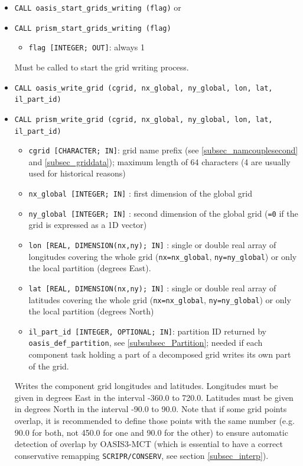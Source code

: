\begin{itemize}

\item {\tt CALL oasis\_start\_grids\_writing (flag)} or
\item {\tt CALL prism\_start\_grids\_writing (flag)}
  \begin{itemize}
  \item {\tt flag [INTEGER; OUT]}: always 1 
  \end{itemize} 
Must be called to start the grid writing process. 
  
  \vspace{0.2cm}
\item {\tt CALL oasis\_write\_grid (cgrid, nx\_global, ny\_global, lon, lat, il\_part\_id)}
\item {\tt CALL prism\_write\_grid (cgrid, nx\_global, ny\_global, lon, lat, il\_part\_id)}
        
  \begin{itemize}
  \item {\tt cgrid [CHARACTER; IN]}: grid name prefix (see
    \ref{subsec_namcouplesecond} and \ref{subsec_griddata}); maximum length of 64 characters (4 are usually used for historical reasons)
  \item {\tt nx\_global [INTEGER; IN]} : first dimension of the global grid 
  \item {\tt ny\_global [INTEGER; IN]} : second dimension of the global grid ({\tt =0} if the grid is expressed as a 1D vector) 
  \item {\tt lon [REAL, DIMENSION(nx,ny); IN]} : single or double real array of longitudes covering the whole grid ({\tt nx=nx\_global}, {\tt ny=ny\_global}) or only the local partition (degrees East).
  \item {\tt lat [REAL, DIMENSION(nx,ny); IN]} : single or double real array of latitudes covering the whole grid ({\tt nx=nx\_global}, {\tt ny=ny\_global}) or only the local partition (degrees North)
\item  {\tt il\_part\_id [INTEGER, OPTIONAL; IN]}: partition ID returned by {\tt oasis\_def\_partition}, see \ref{subsubsec_Partition}; needed if each component task holding a part of a decomposed grid writes its own part of the grid.
  \end{itemize}

  Writes the component grid longitudes and latitudes. Longitudes must be
  given in degrees East in the interval -360.0 to 720.0. Latitudes
  must be given in degrees North in the interval -90.0 to 90.0. Note
  that if some grid points overlap, it is recommended to define those
  points with the same number (e.g. 90.0 for both, not 450.0 for one
  and 90.0 for the other) to ensure automatic detection of overlap by
  OASIS3-MCT (which is essential to have a correct conservative
  remapping \texttt{SCRIPR/CONSERV}, see section \ref{subsec_interp}).


\end{itemize}
